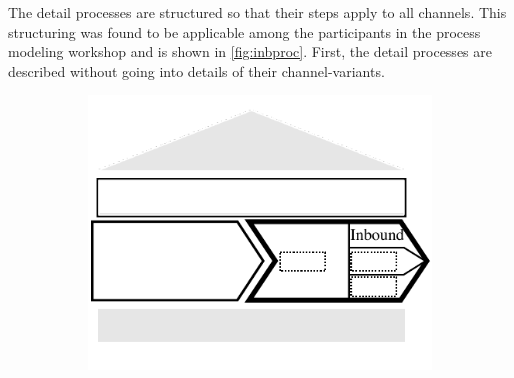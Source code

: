 	The detail processes are structured so that their steps apply to all channels. This structuring was found to be applicable among the participants in the process modeling workshop and is shown in \Fig \ref{fig:inbproc}. First, the detail processes are described without going into details of their channel-variants. 
	
\begin{figure}[caption={Inbound process}, label={fig:inbproc}]
		\begin{subfigure}[b]{.45\textwidth}
			\begin{center}
			\includegraphics{figures/inbound.pdf}
			\end{center}
		\end{subfigure}
		\begin{subfigure}[b]{.45\textwidth}
				\begin{center}
			\end{center}
		\end{subfigure}

\end{figure}

